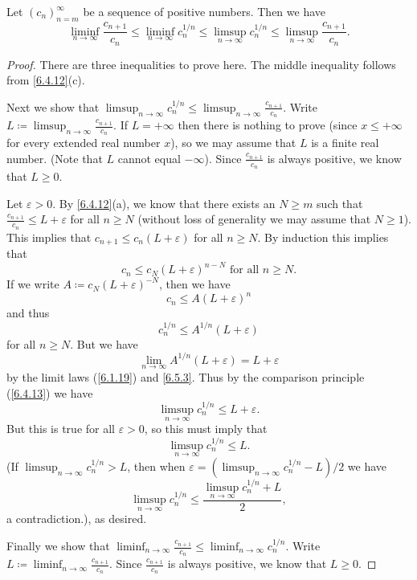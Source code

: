 \begin{lemma}\label{7.5.2}
  Let \((c_n)_{n = m}^\infty\) be a sequence of positive numbers.
  Then we have
  \[
    \liminf_{n \to \infty} \frac{c_{n + 1}}{c_n} \leq \liminf_{n \to \infty} c_n^{1 / n} \leq \limsup_{n \to \infty} c_n^{1 / n} \leq \limsup_{n \to \infty} \frac{c_{n + 1}}{c_n}.
  \]
\end{lemma}

\begin{proof}
  There are three inequalities to prove here.
  The middle inequality follows from \cref{6.4.12}(c).

  Next we show that \(\limsup_{n \to \infty} c_n^{1 / n} \leq \limsup_{n \to \infty} \frac{c_{n + 1}}{c_n}\).
  Write \(L \coloneqq \limsup_{n \to \infty} \frac{c_{n + 1}}{c_n}\).
  If \(L = +\infty\) then there is nothing to prove (since \(x \leq +\infty\) for every extended real number \(x\)), so we may assume that \(L\) is a finite real number.
  (Note that \(L\) cannot equal \(-\infty\)).
  Since \(\frac{c_{n + 1}}{c_n}\) is always positive, we know that \(L \geq 0\).

  Let \(\varepsilon > 0\).
  By \cref{6.4.12}(a), we know that there exists an \(N \geq m\) such that \(\frac{c_{n + 1}}{c_n} \leq L + \varepsilon\) for all \(n \geq N\)
  (without loss of generality we may assume that \(N \geq 1\)).
  This implies that \(c_{n + 1} \leq c_n (L + \varepsilon)\) for all \(n \geq N\).
  By induction this implies that
  \[
    c_n \leq c_N (L + \varepsilon)^{n - N} \text{ for all } n \geq N.
  \]
  If we write \(A \coloneqq c_N (L + \varepsilon)^{-N}\), then we have
  \[
    c_n \leq A(L + \varepsilon)^n
  \]
  and thus
  \[
    c_n^{1 / n} \leq A^{1 / n} (L + \varepsilon)
  \]
  for all \(n \geq N\).
  But we have
  \[
    \lim_{n \to \infty} A^{1 / n} (L + \varepsilon) = L + \varepsilon
  \]
  by the limit laws (\cref{6.1.19}) and \cref{6.5.3}.
  Thus by the comparison principle (\cref{6.4.13}) we have
  \[
    \limsup_{n \to \infty} c_n^{1 / n} \leq L + \varepsilon.
  \]
  But this is true for all \(\varepsilon > 0\), so this must imply that
  \[
    \limsup_{n \to \infty} c_n^{1 / n} \leq L.
  \]
  (If \(\limsup_{n \to \infty} c_n^{1 / n} > L\), then when \(\varepsilon = (\limsup_{n \to \infty} c_n^{1 / n} - L) / 2\) we have
  \[
    \limsup_{n \to \infty} c_n^{1 / n} \leq \frac{\limsup_{n \to \infty} c_n^{1 / n} + L}{2},
  \]
  a contradiction.), as desired.

  Finally we show that \(\liminf_{n \to \infty} \frac{c_{n + 1}}{c_n} \leq \liminf_{n \to \infty} c_n^{1 / n}\).
  Write \(L \coloneqq \liminf_{n \to \infty} \frac{c_{n + 1}}{c_n}\).
  Since \(\frac{c_{n + 1}}{c_n}\) is always positive, we know that \(L \geq 0\).


\end{proof}
